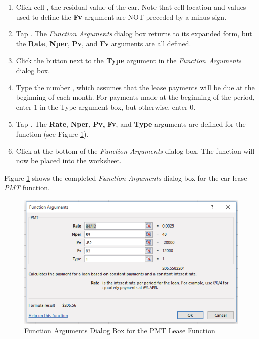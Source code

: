 \begin{enumbox}
\begin{enumerate}
		\item Click cell , the residual value of the car. Note that cell location and values used to define the \textbf{Fv} argument are NOT preceded by a minus sign.
		\item Tap . The \textit{Function Arguments} dialog box returns to its expanded form, but the \textbf{Rate}, \textbf{Nper}, \textbf{Pv}, and \textbf{Fv} arguments are all defined.
		\item Click the  button next to the \textbf{Type} argument in the \textit{Function Arguments} dialog box. 
		\item Type the number , which assumes that the lease payments will be due at the beginning of each month. For payments made at the beginning of the period, enter $ 1 $ in the Type argument box, but otherwise, enter $ 0 $.
		\item Tap . The \textbf{Rate}, \textbf{Nper}, \textbf{Pv}, \textbf{Fv}, and \textbf{Type} arguments are defined for the function (see Figure \ref{02:fig34}).
		\item Click  at the bottom of the \textit{Function Arguments} dialog box. The function will now be placed into the worksheet.
	\end{enumerate}
\end{enumbox}

Figure \ref{02:fig34} shows the completed \textit{Function Arguments} dialog box for the car lease \textit{PMT} function.

\begin{figure}[H]
	\centering
	\includegraphics[width=\maxwidth{.95\linewidth}]{gfx/ch02_fig34}
	\caption{Function Arguments Dialog Box for the PMT Lease Function}
	\label{02:fig34}
\end{figure}

